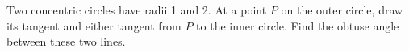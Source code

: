 Two concentric circles have radii 1 and 2. At a point $P$ on the outer circle, draw its tangent and either tangent from $P$ to the inner circle. Find the obtuse angle between these two lines.
